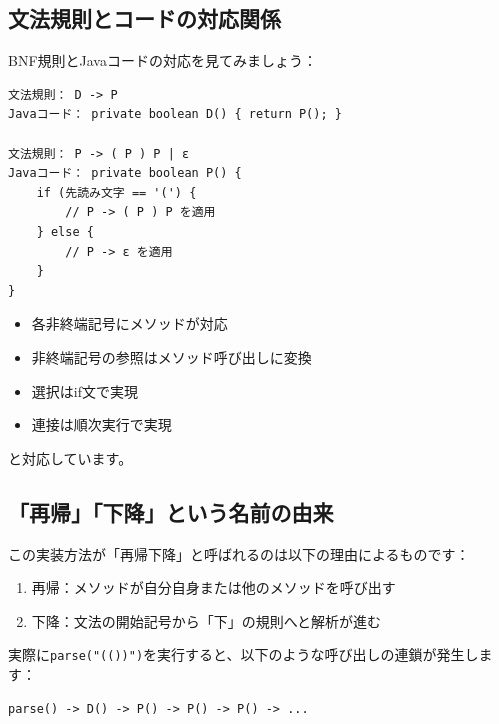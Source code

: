 \hypertarget{chapter5-ux6587ux6cd5ux898fux5247ux3068ux30b3ux30fcux30c9ux306eux5bfeux5fdcux95a2ux4fc2}{%
\subsection{文法規則とコードの対応関係}\label{chapter5-ux6587ux6cd5ux898fux5247ux3068ux30b3ux30fcux30c9ux306eux5bfeux5fdcux95a2ux4fc2}}

BNF規則とJavaコードの対応を見てみましょう：

\begin{verbatim}
文法規則： D -> P
Javaコード： private boolean D() { return P(); }

文法規則： P -> ( P ) P | ε
Javaコード： private boolean P() {
    if (先読み文字 == '(') {
        // P -> ( P ) P を適用
    } else {
        // P -> ε を適用
    }
}
\end{verbatim}

\begin{itemize}
\tightlist
\item
  各非終端記号にメソッドが対応
\item
  非終端記号の参照はメソッド呼び出しに変換
\item
  選択はif文で実現
\item
  連接は順次実行で実現
\end{itemize}

と対応しています。

\hypertarget{chapter5-ux518dux5e30ux4e0bux964dux3068ux3044ux3046ux540dux524dux306eux7531ux6765}{%
\subsection{「再帰」「下降」という名前の由来}\label{chapter5-ux518dux5e30ux4e0bux964dux3068ux3044ux3046ux540dux524dux306eux7531ux6765}}

この実装方法が「再帰下降」と呼ばれるのは以下の理由によるものです：

\begin{enumerate}
\def\labelenumi{\arabic{enumi}.}
\tightlist
\item
  再帰：メソッドが自分自身または他のメソッドを呼び出す
\item
  下降：文法の開始記号から「下」の規則へと解析が進む
\end{enumerate}

実際に\texttt{parse("(())")}を実行すると、以下のような呼び出しの連鎖が発生します：

\begin{verbatim}
parse() -> D() -> P() -> P() -> P() -> ...
\end{verbatim}

